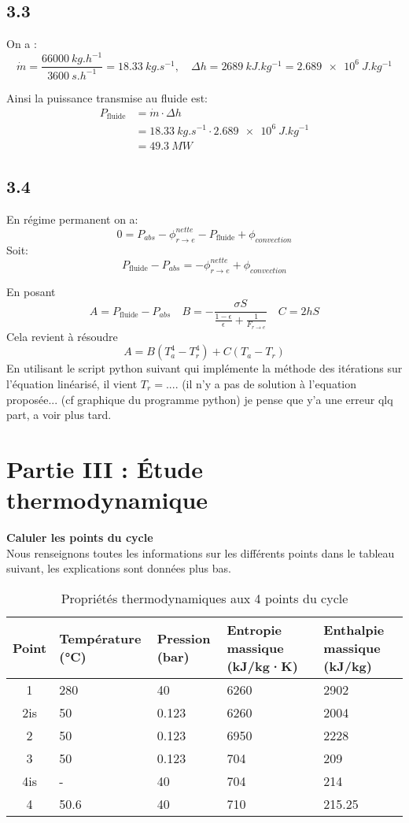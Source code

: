 \documentclass[12pt]{article}
\begin{document}
\subsection*{3.3}
On a :
\[
\dot{m} = \frac{\SI{66000}{kg.h^{-1}}}{\SI{3600}{s.h^{-1}}} = \SI{18.33}{kg.s^{-1}}, \quad
\Delta h = \SI{2689}{kJ.kg^{-1}} = \SI{2.689e6}{J.kg^{-1}}
\]

Ainsi la puissance transmise au fluide est:
\begin{align*}
P_{\text{fluide}} &= \dot{m} \cdot \Delta h \\ &= \SI{18.33}{kg.s^{-1}} \cdot \SI{2.689e6}{J.kg^{-1}} \\ &= \boxed{\SI{49.3}{MW}}
\end{align*}

\subsection*{3.4}
En régime permanent on a:
\[
0 = P_{abs} - \phi^{nette}_{r \rightarrow e} - P_{\text{fluide}} + \phi_{convection}
\]
Soit:
\[
P_{\text{fluide}} - P_{abs}  = -\phi^{nette}_{r \rightarrow e} + \phi_{convection}
\]

En posant
\[
A = P_{\text{fluide}} - P_{abs} \quad B = -\frac{\sigma S}{\frac{1-\epsilon}{\epsilon} + \frac{1}{F_{r \rightarrow e}}} \quad C = 2hS
\]
Cela revient à résoudre
\[
A = B(T_a^4 - T_r^4) + C(T_a - T_r)
\]
En utilisant le script python suivant qui implémente la méthode des itérations sur l'équation linéarisé, il vient $T_r=...$. (il n'y a pas de solution à l'equation proposée... (cf graphique du programme python) je pense que y'a une erreur qlq part, a voir plus tard.



\section*{Partie III : Étude thermodynamique}

\textbf{Caluler les points du cycle}
\\
Nous renseignons toutes les informations sur les différents points dans le tableau suivant, les explications sont données plus bas.

\begin{table}[h!]
\centering
\begin{tabularx}{\textwidth}{|c|X|X|X|X|}
\hline
\textbf{Point} & \textbf{Température (°C)} & \textbf{Pression (bar)} & \textbf{Entropie massique (kJ/kg·K)} & \textbf{Enthalpie massique (kJ/kg)} \\
\hline
1 & 280 & 40 & 6260 & 2902 \\
\hline
2is & 50 & 0.123 & 6260 & 2004 \\
\hline
2 & 50 & 0.123 & 6950 & 2228 \\
\hline
3 & 50 & 0.123 & 704 & 209 \\
\hline
4is & - & 40 & 704 & 214 \\
\hline
4 & 50.6 & 40 & 710 & 215.25 \\
\hline
\end{tabularx}
\caption{Propriétés thermodynamiques aux 4 points du cycle}
\label{tab:points_thermo}
\end{table}
\end{document}
